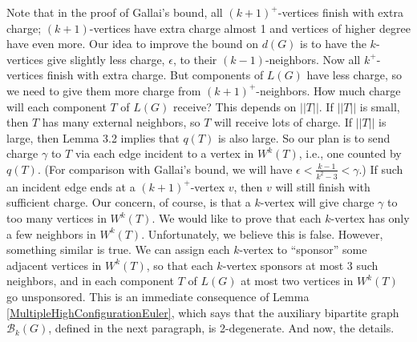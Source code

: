\documentclass[12pt]{article}
\theoremstyle{plain}
\theoremstyle{definition}
\theoremstyle{remark}
\newcommand{\fancy}[1]{\mathcal{#1}}
\newcommand{\B}{\fancy{B}}
\begin{document}
Note that in the proof of Gallai's bound, all $(k+1)^+$-vertices finish with
extra charge; $(k+1)$-vertices have extra charge almost 1 and vertices of
higher degree have even more.  Our idea to improve the bound on $d(G)$ is to
have the $k$-vertices give slightly less charge, $\epsilon$, to their
$(k-1)$-neighbors.  Now all $k^+$-vertices finish with extra charge.  But
components of $L(G)$ have less charge, so we need to give them more charge
from $(k+1)^+$-neighbors.  How much charge will each component $T$ of $L(G)$
receive? This depends on $||T||$.  If $||T||$ is small, then $T$ has many
external neighbors, so $T$ will receive lots of charge.  If $||T||$ is large,
then Lemma 3.2 implies that $q(T)$ is also large.  So our plan is to send
charge $\gamma$ to $T$ via each edge incident to a vertex in $W^k(T)$, i.e.,
one counted by $q(T)$.  (For comparison with Gallai's bound, we will have
$\epsilon < \frac{k-1}{k^2-3} < \gamma$.)  If such an incident edge ends at a
$(k+1)^+$-vertex $v$, then $v$ will still finish with sufficient charge.  Our
concern, of course, is that a $k$-vertex will give charge $\gamma$ to too many
vertices in $W^k(T)$.  We would like to prove that each $k$-vertex has only a
few neighbors in $W^k(T)$.  Unfortunately, we believe this is false. However,
something similar is true.  We can assign each $k$-vertex to ``sponsor'' some
adjacent vertices in $W^k(T)$, so that each
$k$-vertex sponsors at most 3 such neighbors, and in each component $T$ of
$L(G)$ at most two vertices in $W^k(T)$ go unsponsored.  This is an
immediate consequence of Lemma \ref{MultipleHighConfigurationEuler}, which says
that the auxiliary bipartite graph $\B_k(G)$, defined in 
the next paragraph, is 2-degenerate.  And now, the details.
\end{document}
